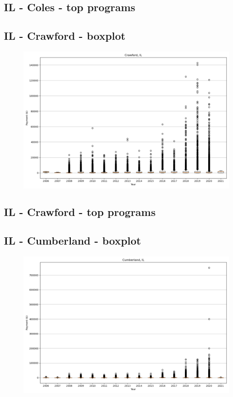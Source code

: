 \subsection*{IL - Coles - top programs}

\newpage
\subsection*{IL - Crawford - boxplot}
\begin{figure}[h]
\centering
\includegraphics[width=7in]{../output/boxplots/counties/Crawford-IL_boxplot.png}
\end{figure}


\subsection*{IL - Crawford - top programs}

\newpage
\subsection*{IL - Cumberland - boxplot}
\begin{figure}[h]
\centering
\includegraphics[width=7in]{../output/boxplots/counties/Cumberland-IL_boxplot.png}
\end{figure}


